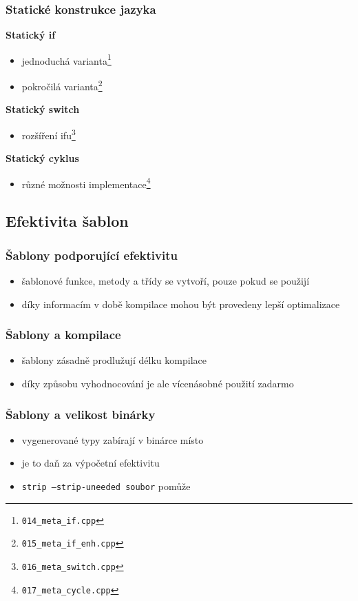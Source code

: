 	\begin{frame}
		\frametitle{Statické konstrukce jazyka}
		\textbf{Statický if}
		\begin{itemize}
			\item{jednoduchá varianta\footnote{\texttt{014\_meta\_if.cpp}}}
			\item{pokročilá varianta\footnote{\texttt{015\_meta\_if\_enh.cpp}}}
		\end{itemize}
		\textbf{Statický switch}
		\begin{itemize}
			\item{rozšíření ifu\footnote{\texttt{016\_meta\_switch.cpp}}}
		\end{itemize}
		\textbf{Statický cyklus}
		\begin{itemize}
			\item{různé možnosti implementace\footnote{\texttt{017\_meta\_cycle.cpp}}}
		\end{itemize}
	\end{frame}

	\subsection{Efektivita šablon}

	\begin{frame}
		\frametitle{Šablony podporující efektivitu}
		\begin{itemize}
			\item{šablonové funkce, metody a třídy se vytvoří, pouze pokud se použijí}
			\item{díky informacím v době kompilace mohou být provedeny lepší optimalizace}
		\end{itemize}
	\end{frame}

	\begin{frame}
		\frametitle{Šablony a kompilace}
		\begin{itemize}
			\item{šablony zásadně prodlužují délku kompilace}
			\item{díky způsobu vyhodnocování je ale vícenásobné použití zadarmo}
		\end{itemize}
	\end{frame}

	\begin{frame}
		\frametitle{Šablony a velikost binárky}
		\begin{itemize}
			\item{vygenerované typy zabírají v binárce místo}
			\item{je to daň za výpočetní efektivitu}
			\item{\texttt{strip --strip-uneeded soubor} pomůže}
		\end{itemize}
	\end{frame}

